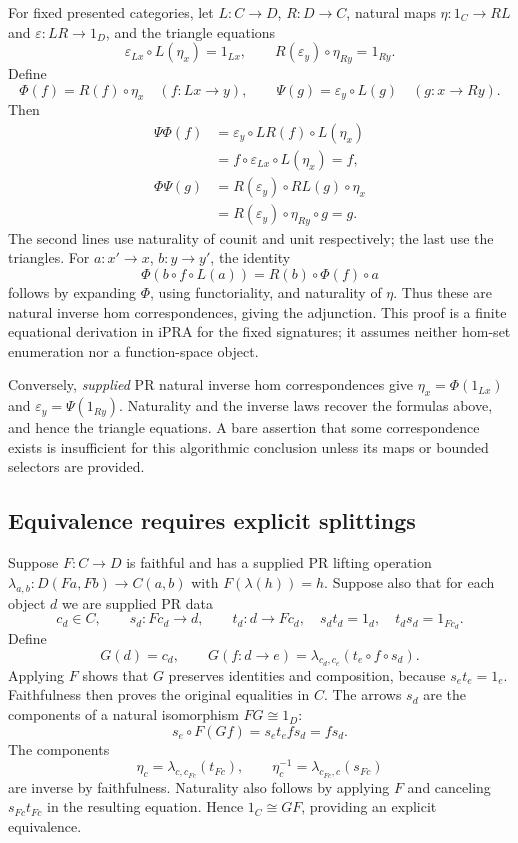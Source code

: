 For fixed presented categories, let $L:C\to D$, $R:D\to C$, natural maps
$\eta:1_C\to RL$ and $\varepsilon:LR\to1_D$, and the triangle equations
\[
 \varepsilon_{Lx}\circ L(\eta_x)=1_{Lx},\qquad
 R(\varepsilon_y)\circ\eta_{Ry}=1_{Ry}.
\]
Define
\[
 \Phi(f)=R(f)\circ\eta_x\quad(f:Lx\to y),\qquad
 \Psi(g)=\varepsilon_y\circ L(g)\quad(g:x\to Ry).
\]
Then
\begin{align*}
 \Psi\Phi(f)
 &=\varepsilon_y\circ LR(f)\circ L(\eta_x)\\
 &=f\circ\varepsilon_{Lx}\circ L(\eta_x)=f,\\
 \Phi\Psi(g)
 &=R(\varepsilon_y)\circ RL(g)\circ\eta_x\\
 &=R(\varepsilon_y)\circ\eta_{Ry}\circ g=g.
\end{align*}
The second lines use naturality of counit and unit respectively; the last use
the triangles.  For $a:x'\to x$, $b:y\to y'$, the identity
\[
 \Phi(b\circ f\circ L(a))=R(b)\circ\Phi(f)\circ a
\]
follows by expanding $\Phi$, using functoriality, and naturality of $\eta$.
Thus these are natural inverse hom correspondences, giving the adjunction.
This proof is a finite equational derivation in iPRA for the fixed signatures;
it assumes neither hom-set enumeration nor a function-space object.

Conversely, \emph{supplied} PR natural inverse hom correspondences give
$\eta_x=\Phi(1_{Lx})$ and $\varepsilon_y=\Psi(1_{Ry})$.  Naturality and the inverse
laws recover the formulas above, and hence the triangle equations.  A bare
assertion that some correspondence exists is insufficient for this
algorithmic conclusion unless its maps or bounded selectors are provided.

\subsection{Equivalence requires explicit splittings}

Suppose $F:C\to D$ is faithful and has a supplied PR lifting operation
$\lambda_{a,b}:D(Fa,Fb)\to C(a,b)$ with
$F(\lambda(h))=h$.  Suppose also that for each object $d$ we are supplied PR data
\[
 c_d\in C,\qquad s_d:Fc_d\to d,\qquad t_d:d\to Fc_d,
 \quad s_dt_d=1_d,\quad t_ds_d=1_{Fc_d}.
\]
Define
\[
 G(d)=c_d,\qquad
 G(f:d\to e)=\lambda_{c_d,c_e}(t_e\circ f\circ s_d).
\]
Applying $F$ shows that $G$ preserves identities and composition, because
$s_et_e=1_e$.  Faithfulness then proves the original equalities in $C$.
The arrows $s_d$ are the components of a natural isomorphism $FG\cong1_D$:
\[
 s_e\circ F(Gf)=s_et_efs_d=fs_d.
\]
The components
\[
 \eta_c=\lambda_{c,c_{Fc}}(t_{Fc}),\qquad
 \eta_c^{-1}=\lambda_{c_{Fc},c}(s_{Fc})
\]
are inverse by faithfulness.  Naturality also follows by applying $F$ and
canceling $s_{Fc}t_{Fc}$ in the resulting equation.  Hence $1_C\cong GF$,
providing an explicit equivalence.

